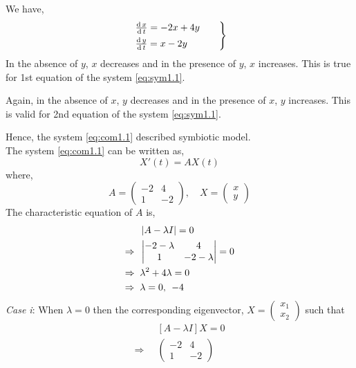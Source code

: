 \documentclass[../main-sheet.tex]{subfiles}
\begin{document}
\begin{soln}
    We have,
    \begin{equation}
        \begin{rcases}
            \,\frac{\mathrm{d}\,x}{\mathrm{d}\,t}=-2x+4y\qquad\\
        \,\frac{\mathrm{d}\,y}{\mathrm{d}\,t}=x-2y
        \end{rcases}
        \label{eq:sym1.1}
    \end{equation}
    In the absence of \(y\), \(x\) decreases and in the presence of \(y\), \(x\) increases. This is true for 1st equation of the system \eqref{eq:sym1.1}.

    Again, in the absence of \(x\), \(y\) decreases and in the presence of \(x\), \(y\) increases. This is valid for 2nd equation of the system \eqref{eq:sym1.1}.

    Hence, the system \eqref{eq:com1.1} described symbiotic model.\\
    The system \eqref{eq:com1.1} can be written as,
    \[X'(t)=AX(t)\]
    where,
    \[A=\begin{pmatrix}
        -2&4\\
        1&-2
    \end{pmatrix},\quad X=\begin{pmatrix}
        x\\
        y
    \end{pmatrix}\]
    The characteristic equation of \(A \) is,
    \begin{align*}
        &\left\vert A-\lambda I\right\vert=0\\
        \Rightarrow\;\;&\begin{vmatrix}
            -2-\lambda & 4\\
            1 & -2-\lambda
        \end{vmatrix}=0\\
        \Rightarrow\;\;&\lambda^2+4\lambda=0\\
        \Rightarrow\;\;&\lambda=0,\,\;-4
    \end{align*}
    \emph{Case i}: When \(\lambda=0\) then the corresponding eigenvector, \(\displaystyle X=\begin{pmatrix}
        x_1\\
        x_2
    \end{pmatrix}\) such that
    \begin{align*}
        &[A-\lambda I]X=0\\
        \Rightarrow\;\;&\begin{pmatrix}
            -2&4\\
            1&-2

\end{pmatrix}
\end{align*}
\end{soln}
\end{document}
